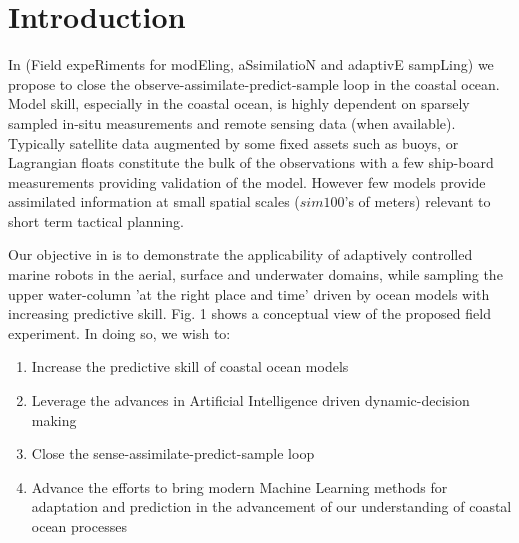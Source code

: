 \section{Introduction}





In \proj (Field expeRiments for modEling, aSsimilatioN and adaptivE
sampLing) we propose to close the observe-assimilate-predict-sample loop
in the coastal ocean. Model skill, especially in the coastal ocean, is
highly dependent on sparsely sampled in-situ measurements and remote
sensing data (when available). Typically satellite data augmented by
some fixed assets such as buoys, or Lagrangian floats constitute the
bulk of the observations with a few ship-board measurements providing
validation of the model. However few models provide assimilated
information at small spatial scales ($sim 100$'s of meters) relevant to
short term tactical planning.

Our objective in \proj is to demonstrate the applicability of adaptively
controlled marine robots in the aerial, surface and underwater domains,
while sampling the upper water-column 'at the right place and time'
driven by ocean models with increasing predictive skill. Fig. 1 shows a
conceptual view of the proposed field experiment. In doing so, we wish
to:

\begin{enumerate}

\item Increase the predictive skill of coastal ocean models

\item Leverage the advances in Artificial Intelligence driven
  dynamic-decision making

\item Close the sense-assimilate-predict-sample loop
  
\item Advance the efforts to bring modern Machine Learning methods for
  adaptation and prediction in the advancement of our understanding of
  coastal ocean processes
  
\end{enumerate}


